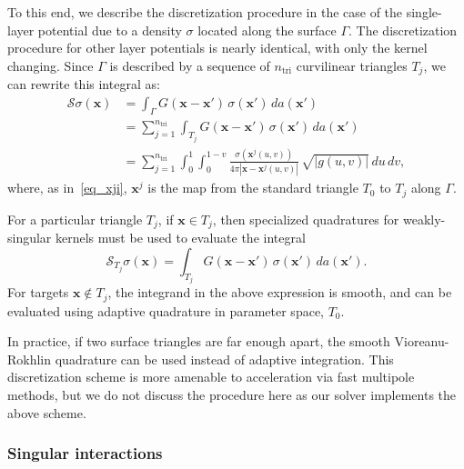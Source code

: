 \documentclass[11pt]{article}
\newcommand{\bx}{\bm x}
\newcommand{\cS}{\mathcal S}
\newcommand{\ntri}{n_{\text{tri}}}
\numberwithin{equation}{section}
\begin{document}
To this end, we describe the discretization procedure in the case of
the single-layer potential due to a density $\sigma$ located along the
surface $\Gamma$. The discretization procedure for other layer
potentials is nearly identical, with only the kernel changing.
Since $\Gamma$ is described by a sequence of $\ntri$
curvilinear triangles $T_j$, we can rewrite this integral as:
\begin{equation}\label{eq_ssigma}
  \begin{aligned}
    \cS\sigma(\bx) &= \int_\Gamma G(\bx-\bx') \, \sigma(\bx') \, da(\bx') \\
    &= \sum_{j = 1}^{\ntri} \int_{T_j} G(\bx-\bx') \, \sigma(\bx') \, da(\bx') \\
    &= \sum_{j = 1}^{\ntri}  \int_0^1 \int_0^{1-v} 
    \frac{\sigma(\bx^j(u,v))}{4\pi |\bx - \bx^j(u,v)|} \, 
    \sqrt{|g(u,v)|} \, du \, dv,
 \end{aligned}
\end{equation}
where, as in~\eqref{eq_xji}, $\bx^j$ is the map from the standard triangle
$T_0$ to $T_j$ along $\Gamma$.



For a particular triangle $T_j$, if $\bx \in T_j$, then 
specialized quadratures for weakly-singular kernels
must be used to evaluate the integral
\begin{equation}
\cS_{T_j}\sigma(\bx) =   \int_{T_j} G(\bx-\bx') \, \sigma(\bx') \, da(\bx').
\end{equation}
For targets $\bx \notin T_j$, the integrand in
the above expression is smooth, and can be evaluated using adaptive
quadrature in parameter space, $T_0$.


In practice, if two surface triangles are far enough apart, the smooth
Vioreanu-Rokhlin quadrature can be used instead of adaptive
integration. This discretization scheme is more amenable to
acceleration via fast multipole methods, but we do not discuss the
procedure here as our solver implements the above scheme.



\subsubsection{Singular interactions}
\end{document}
